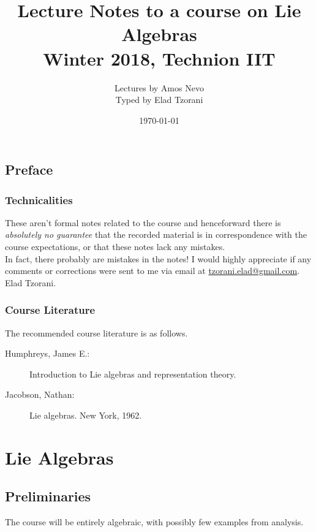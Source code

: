 \documentclass[10pt,a4paper,twoside,openany,hidelinks]{book}
\title{Lecture Notes to a course on Lie Algebras \\ \large{Winter 2018, Technion IIT}}
\author{Lectures by Amos Nevo \\ \large Typed by Elad Tzorani}
\date{\today}
\begin{document}
\frontmatter
{}
\tableofcontents
\countlectures
\newpage

\chapter*{Preface}
 

\section*{Technicalities}

These aren't formal notes related to the course and henceforward there is \emph{absolutely no guarantee} that the recorded material is in correspondence with the course expectations, or that these notes lack any mistakes.\\
In fact, there probably are mistakes in the notes! I would highly appreciate if any comments or corrections were sent to me via email at \href{mailto:tzorani.elad@gmail.com}{tzorani.elad@gmail.com}.\\
Elad Tzorani.

\section*{Course Literature}

The recommended course literature is as follows.

\begin{description}
\item[Humphreys, James E.:] Introduction to Lie algebras and representation theory.

\item[Jacobson, Nathan:] Lie algebras. New York, 1962.
\end{description}

\mainmatter

\part{Lie Algebras}
\chapter{Preliminaries}

The course will be entirely algebraic, with possibly few examples from analysis.%
\end{document}
